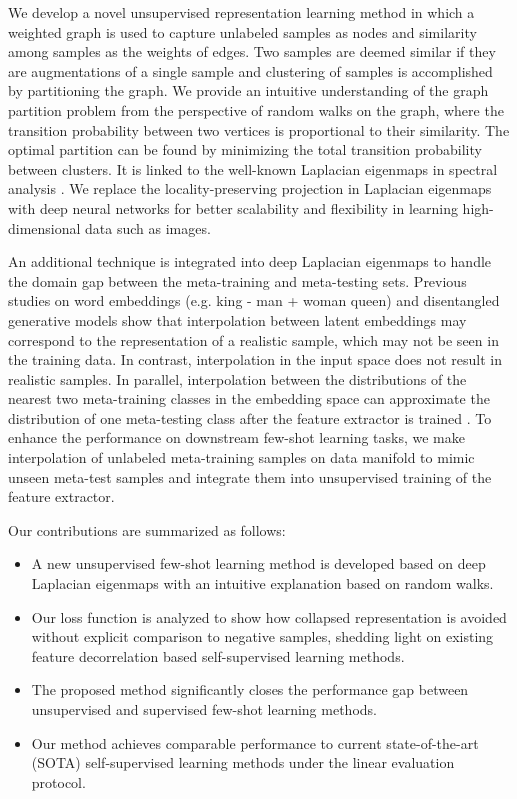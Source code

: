 \documentclass{article}
\begin{document}
We develop a novel unsupervised representation learning method in which a weighted graph is used to capture unlabeled samples as nodes and similarity among samples as the weights of edges. Two samples are deemed similar if they are augmentations of a single sample and clustering of samples is accomplished by partitioning the graph. We provide an intuitive understanding of the graph partition problem from the perspective of random walks on the graph, where the transition probability between two vertices is proportional to their similarity. The optimal partition can be found by minimizing the total transition probability between clusters. It is linked to the well-known Laplacian eigenmaps in spectral analysis \citep{shi:Malik:2000,meila:shi:2000learning,belkin:Niyogi:2003laplacian}. We replace the locality-preserving projection in Laplacian eigenmaps with deep neural networks for better scalability and flexibility in learning high-dimensional data such as images.

An additional technique is integrated into deep Laplacian eigenmaps to handle the domain gap between the meta-training and meta-testing sets. Previous studies on word embeddings  (e.g. king - man + woman  queen) \citep{Mikolov:etal:2013} and disentangled generative models \citep{karras:etal:2019style} show that interpolation between latent embeddings may correspond to the representation of a realistic sample, which may not be seen in the training data. In contrast, interpolation in the input space does not result in realistic samples. In parallel, interpolation between the distributions of the nearest two meta-training classes in the embedding space can approximate the distribution of one meta-testing class after the feature extractor is trained \citep{yang:etal:2021free}. To enhance the performance on downstream few-shot learning tasks, we make interpolation of unlabeled meta-training samples on data manifold to mimic unseen meta-test samples and integrate them into unsupervised training of the feature extractor. 

Our contributions are summarized as follows:
\begin{itemize}
  \item A new unsupervised few-shot learning method is developed based on deep Laplacian eigenmaps with an intuitive explanation based on random walks.
  \item Our loss function is analyzed to show how collapsed representation is avoided without explicit comparison to negative samples, shedding light on existing feature decorrelation based self-supervised learning methods.
  \item The proposed method significantly closes the performance gap between unsupervised and supervised few-shot learning methods.
  \item Our method achieves comparable performance to current state-of-the-art (SOTA) self-supervised learning methods under the linear evaluation protocol.
\end{itemize}
\end{document}
